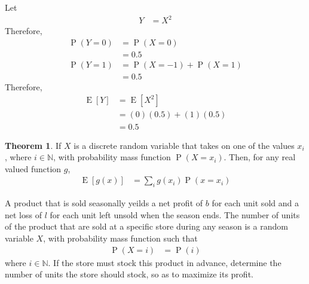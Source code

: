 \documentclass[titlepage, fleqn, a4paper, 12pt, twoside]{article}
\theoremstyle{definition}
\theoremstyle{theorem}
\newtheorem{theorem}{Theorem}
\DeclareMathOperator{\prob}{\mathrm{P}}
\DeclareMathOperator{\expct}{\mathrm{E}}
\begin{document}
\begin{solution}
	Let
	\begin{align*}
		Y & = X^2
	\end{align*}
	Therefore,
	\begin{align*}
		\prob(Y = 0) & = \prob(X = 0)                 \\
                             & = 0.5                          \\
		\prob(Y = 1) & = \prob(X = -1) + \prob(X = 1) \\
                             & = 0.5
	\end{align*}
	Therefore,
	\begin{align*}
		\expct[Y] & = \expct\left[ X^2 \right] \\
                          & = (0) (0.5) + (1) (0.5)    \\
                          & = 0.5
	\end{align*}
\end{solution}

\begin{theorem}
	If $X$ is a discrete random variable that takes on one of the values $x_i$, where $i \in \mathbb{N}$, with probability mass function $\prob(X = x_i)$.
	Then, for any real valued function $g$,
	\begin{align*}
		\expct\left[ g(x) \right] & = \sum\limits_{i} g(x_i) \prob(x = x_i)
	\end{align*}
\end{theorem}

\begin{question}
	A product that is sold seasonally yeilds a net profit of $b$ for each unit sold and a net loss of $l$ for each unit left unsold when the season ends.
	The number of units of the product that are sold at a specific store during any season is a random variable $X$, with probability mass function such that
	\begin{align*}
		\prob(X = i) & = \prob(i)
	\end{align*}
	where $i \in \mathbb{N}$.
	If the store must stock this product in advance, determine the number of units the store should stock, so as to maximize its profit.
\end{question}
\end{document}
